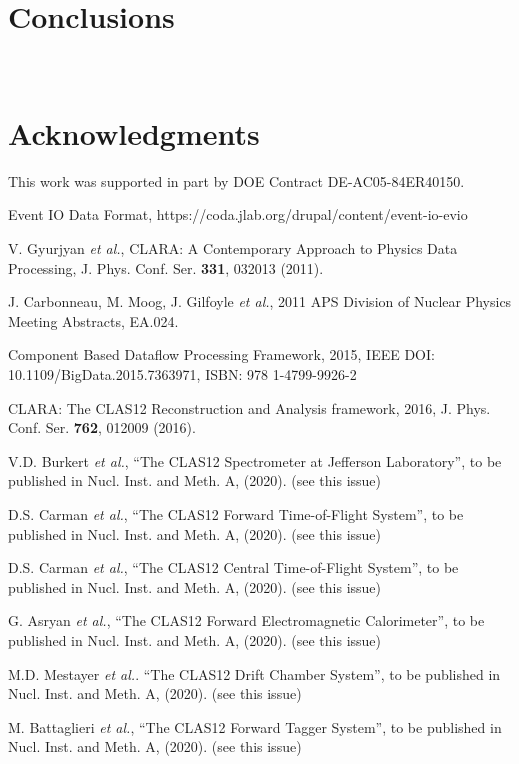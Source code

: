 \documentclass[3p,times,twocolumn]{elsarticle}
\begin{document}
\section{Conclusions}
~~

\section{Acknowledgments}

This work was supported in part by DOE Contract DE-AC05-84ER40150.

\begin{thebibliography}{99}

Event IO Data Format,
https://coda.jlab.org/drupal/content/event-io-evio

V. Gyurjyan {\it et al.}, CLARA: A Contemporary Approach to Physics Data Processing, J. Phys. Conf. Ser.
{\bf 331}, 032013 (2011).

J. Carbonneau, M. Moog,  J. Gilfoyle {\it et al.}, 2011 APS Division of Nuclear Physics Meeting Abstracts, EA.024.

Component Based Dataflow Processing Framework, 2015, IEEE DOI: 10.1109/BigData.2015.7363971,
ISBN: 978 1-4799-9926-2

CLARA: The CLAS12 Reconstruction and Analysis framework, 2016, J. Phys. Conf. Ser. {\bf 762}, 012009 (2016).

V.D. Burkert {\it et al.}, ``The CLAS12 Spectrometer at Jefferson Laboratory'', to be published in Nucl.
Inst. and Meth. A, (2020). (see this issue)

D.S. Carman {\it et al.},   ``The CLAS12 Forward Time-of-Flight System'', to be published in Nucl.
Inst. and Meth. A, (2020). (see this issue)

D.S. Carman {\it et al.}, ``The CLAS12 Central Time-of-Flight System'', to be published in Nucl.
Inst. and Meth. A, (2020). (see this issue)

G. Asryan {\it et al.}, ``The CLAS12 Forward Electromagnetic Calorimeter'', to be published in Nucl.
Inst. and Meth. A, (2020). (see this issue)

M.D. Mestayer {\it et al.}. ``The CLAS12 Drift Chamber System'', to be published in Nucl. Inst. and
Meth. A, (2020). (see this issue)

M. Battaglieri {\it et al.}, ``The CLAS12 Forward Tagger System'', to be published in Nucl. Inst. and
Meth. A, (2020). (see this issue)


\end{thebibliography}
\end{document}
